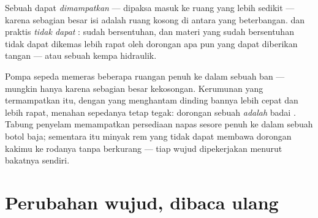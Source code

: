 \begin{proposition}\label{prop:g7:states-of-matter:squeeze}
Sebuah  dapat \emph{dimampatkan} --- dipaksa
masuk ke ruang yang lebih sedikit --- karena sebagian besar isi 
adalah ruang kosong di antara  yang beterbangan.  dan
 praktis \emph{tidak dapat }:  sudah
bersentuhan, dan materi yang sudah bersentuhan tidak dapat dikemas
lebih rapat oleh dorongan apa pun yang dapat diberikan tangan --- atau
sebuah kempa hidraulik.
\end{proposition}

\begin{example}\label{ex:g7:states-of-matter:squeezed}
Pompa sepeda memeras beberapa ruangan penuh  ke dalam sebuah ban
--- mungkin hanya karena  sebagian besar kekosongan. Kerumunan
yang termampatkan itu, dengan  yang menghantam dinding bannya
lebih cepat dan lebih rapat, menahan sepedanya tetap tegak: dorongan
sebuah  \emph{adalah} badai . Tabung penyelam memampatkan
persediaan napas sesore penuh ke dalam sebuah botol baja; sementara
itu minyak rem yang tidak dapat  membawa dorongan kakimu ke
rodanya tanpa berkurang --- tiap wujud dipekerjakan menurut bakatnya
sendiri.
\end{example}

\section{Perubahan wujud, dibaca ulang}

